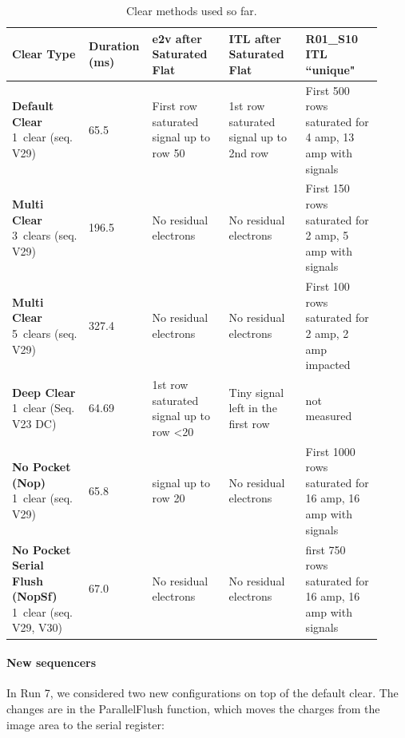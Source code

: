{\tiny
\begin{longtable}{|p{0.2\linewidth}|p{0.12\linewidth}|p{0.2\linewidth}|p{0.2\linewidth}|p{0.2\linewidth}|}
\caption{Clear methods used so far. \label{tab:clears}} \\
\hline
\textbf{Clear Type} & \textbf{Duration (ms)} & \textbf{e2v after Saturated Flat} & \textbf{ITL after Saturated Flat} & \textbf{R01\_S10 ITL ``unique"} \\
\hline
\endfirsthead

\endhead

\hline
\endfoot

\hline
\endlastfoot

\textbf{Default Clear} 1~clear (seq. V29) & 65.5 & First row saturated signal up to row 50 & 1st row saturated signal up to 2nd row & First 500 rows saturated for 4 amp, 13 amp with signals \\
\textbf{Multi Clear} 3~clears (seq. V29) & 196.5 & No residual electrons & No residual electrons & First 150 rows saturated for 2 amp, 5 amp with signals \\
\textbf{Multi Clear} 5~clears (seq. V29) & 327.4 & No residual electrons & No residual electrons & First 100 rows saturated for 2 amp, 2 amp impacted \\
\textbf{Deep Clear} 1~clear (Seq. V23 DC) & 64.69 & 1st row saturated signal up to row <20 & Tiny signal left in the first row & not measured \\
\textbf{No Pocket (Nop)} 1~clear (seq. V29) & 65.8 & signal up to row 20 & No residual electrons & First 1000 rows saturated for 16 amp, 16 amp with signals \\
\textbf{No Pocket Serial Flush (NopSf)} 1~clear (seq. V29, V30) & 67.0 & No residual electrons & No residual electrons & first 750 rows saturated for 16 amp, 16 amp with signals \\
\end{longtable}
}

\paragraph{New sequencers}\label{new-sequencers}
In Run 7, we considered two new configurations on top of the default clear. The changes are in the ParallelFlush function, which
moves the charges from the image area to the serial register:


